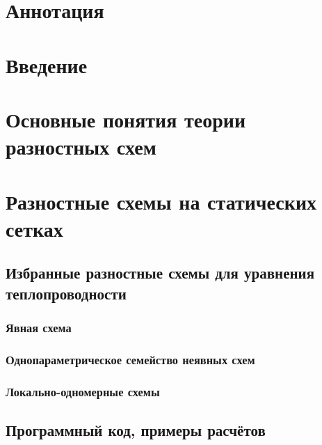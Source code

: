 \documentclass[a4paper, 12pt]{article}
\begin{document}
    
    

    \section*{Аннотация}
    
    \newpage

    \tableofcontents
    \newpage

    \section{Введение}
    

    \section{Основные понятия теории разностных схем}\label{sec:MainDiffSchemes}
    

    \section{Разностные схемы на статических сетках}
        \subsection{Избранные разностные схемы для уравнения теплопроводности}
            \subsubsection{Явная схема}
            \subsubsection{Однопараметрическое семейство неявных схем}
            \subsubsection{Локально-одномерные схемы}
        \subsection{Программный код, примеры расчётов}
    
\end{document}
